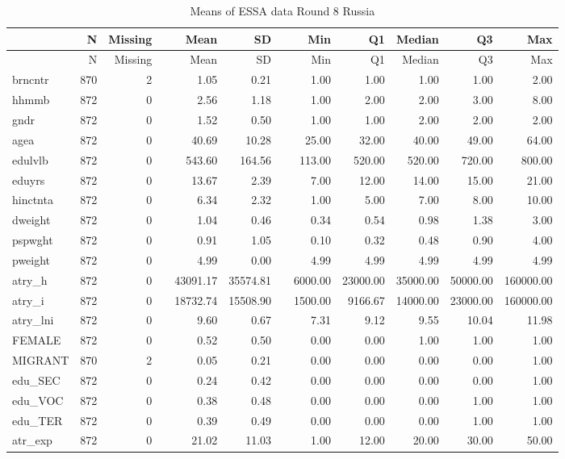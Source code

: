 \documentclass[]{article}
\begin{document}
\begin{longtable}[]{@{}lrrlrrlrrrrr@{}}
\caption{Means of ESSA data Round 8 Russia}\tabularnewline
\toprule
& N & Missing & & Mean & SD & & Min & Q1 & Median & Q3 &
Max\tabularnewline
\midrule
\endfirsthead
\toprule
& N & Missing & & Mean & SD & & Min & Q1 & Median & Q3 &
Max\tabularnewline
\midrule
\endhead
brncntr & 870 & 2 & & 1.05 & 0.21 & & 1.00 & 1.00 & 1.00 & 1.00 &
2.00\tabularnewline
hhmmb & 872 & 0 & & 2.56 & 1.18 & & 1.00 & 2.00 & 2.00 & 3.00 &
8.00\tabularnewline
gndr & 872 & 0 & & 1.52 & 0.50 & & 1.00 & 1.00 & 2.00 & 2.00 &
2.00\tabularnewline
agea & 872 & 0 & & 40.69 & 10.28 & & 25.00 & 32.00 & 40.00 & 49.00 &
64.00\tabularnewline
edulvlb & 872 & 0 & & 543.60 & 164.56 & & 113.00 & 520.00 & 520.00 &
720.00 & 800.00\tabularnewline
eduyrs & 872 & 0 & & 13.67 & 2.39 & & 7.00 & 12.00 & 14.00 & 15.00 &
21.00\tabularnewline
hinctnta & 872 & 0 & & 6.34 & 2.32 & & 1.00 & 5.00 & 7.00 & 8.00 &
10.00\tabularnewline
dweight & 872 & 0 & & 1.04 & 0.46 & & 0.34 & 0.54 & 0.98 & 1.38 &
3.00\tabularnewline
pspwght & 872 & 0 & & 0.91 & 1.05 & & 0.10 & 0.32 & 0.48 & 0.90 &
4.00\tabularnewline
pweight & 872 & 0 & & 4.99 & 0.00 & & 4.99 & 4.99 & 4.99 & 4.99 &
4.99\tabularnewline
atry\_h & 872 & 0 & & 43091.17 & 35574.81 & & 6000.00 & 23000.00 &
35000.00 & 50000.00 & 160000.00\tabularnewline
atry\_i & 872 & 0 & & 18732.74 & 15508.90 & & 1500.00 & 9166.67 &
14000.00 & 23000.00 & 160000.00\tabularnewline
atry\_lni & 872 & 0 & & 9.60 & 0.67 & & 7.31 & 9.12 & 9.55 & 10.04 &
11.98\tabularnewline
FEMALE & 872 & 0 & & 0.52 & 0.50 & & 0.00 & 0.00 & 1.00 & 1.00 &
1.00\tabularnewline
MIGRANT & 870 & 2 & & 0.05 & 0.21 & & 0.00 & 0.00 & 0.00 & 0.00 &
1.00\tabularnewline
edu\_SEC & 872 & 0 & & 0.24 & 0.42 & & 0.00 & 0.00 & 0.00 & 0.00 &
1.00\tabularnewline
edu\_VOC & 872 & 0 & & 0.38 & 0.48 & & 0.00 & 0.00 & 0.00 & 1.00 &
1.00\tabularnewline
edu\_TER & 872 & 0 & & 0.39 & 0.49 & & 0.00 & 0.00 & 0.00 & 1.00 &
1.00\tabularnewline
atr\_exp & 872 & 0 & & 21.02 & 11.03 & & 1.00 & 12.00 & 20.00 & 30.00 &
50.00\tabularnewline
\bottomrule
\end{longtable}
\end{document}
